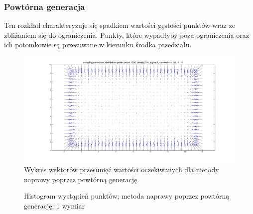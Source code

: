 \documentclass{mini}
\begin{document}
\subsubsection*{Powtórna generacja}
\hspace{3,4ex}Ten rozkład charakteryzuje się spadkiem wartości gęstości punktów wraz ze zbliżaniem się do ograniczenia. Punkty, które wypadłyby poza ograniczenia oraz ich potomkowie są przesuwane w kierunku środka przedziału.

\begin{figure}[H]
\centering
\includegraphics[width=\textwidth]{sampling2dprzesuniecie}
\caption{Wykres wektorów przesunięć wartości oczekiwanych dla metody naprawy poprzez powtórną generację}
\end{figure}

\begin{figure}[H]
\centering
{}
\quad
{}
\caption{Histogram wystąpień punktów; metoda naprawy poprzez powtórną generację; 1 wymiar}
\end{figure}
\end{document}
